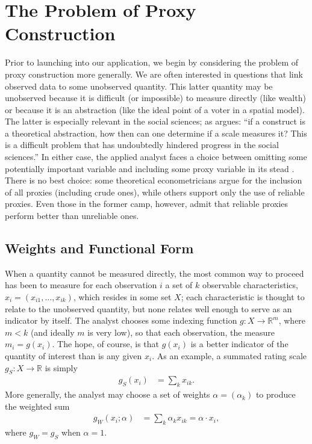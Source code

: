 
\section{The Problem of Proxy Construction}
\label{sec:proxy}
Prior to launching into our application, we begin by considering the problem of proxy construction more generally.  
We are often interested in questions that link observed data to some unobserved quantity.
This latter quantity may be unobserved because it is difficult (or impossible) to measure directly (like wealth) or because it is an abstraction (like the ideal point of a voter in a spatial model).
The latter is especially relevant in the social sciences; as \citet[13]{spector1992} argues:  ``if a construct is a theoretical abstraction, how then can one determine if a scale measures it?  This is a difficult problem that has undoubtedly hindered progress in the social sciences.''
In either case, the applied analyst faces a choice between omitting some potentially important variable and including some proxy variable in its stead \citep{stahlecker1993}.
There is no best choice: some theoretical econometricians \citep[e.g.][]{mccallum1972} argue for the inclusion of all proxies (including crude ones), while others \citep[e.g.][]{maddala1977} support only the use of reliable proxies.
Even those in the former camp, however, admit that reliable proxies perform better than unreliable ones.

\subsection{Weights and Functional Form}
When a quantity cannot be measured directly, the most common way to proceed has been to measure for each observation $i$ a set of $k$ observable characteristics, $x_i = \left(x_{i1}, \ldots, x_{ik}\right)$, which resides in some set $X$; each characteristic is thought to relate to the unobserved quantity, but none relates well enough to serve as an indicator by itself.  
The analyst chooses some indexing function $g:  X \rightarrow \mathbb{R}^m$, where $m < k$ (and ideally $m$ is very low), so that each observation, the measure $m_i = g(x_i)$.
The hope, of course, is that $g(x_i)$ is a better indicator of the quantity of interest than is any given $x_i$.
As an example, a summated rating scale $g_S:  X \rightarrow \mathbb{R}$ is simply
\begin{align*}
  g_S(x_i) &= \sum_{k} x_{ik}.
\end{align*}
More generally, the analyst may choose a set of weights $\alpha = (\alpha_k)$ to produce the weighted sum
\begin{align*}
  g_{W}(x_i; \alpha) &= \sum_{k} \alpha_k x_{ik} = \alpha \cdot x_i,
\end{align*}
where $g_W = g_S$ when $\alpha = 1$.  

